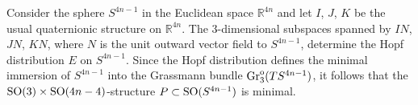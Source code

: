 \documentclass[10pt,a4paper]{amsart}
\numberwithin{equation}{section}
\begin{document}
\begin{Example}
Consider the sphere $S^{4n-1}$ in the Euclidean space $\mathbb{R}^{4n}$ and let $I$, $J$, $K$ be the usual quaternionic structure on $\mathbb{R}^{4n}$. The $3$-dimensional subspaces spanned by $IN$, $JN$, $KN$, where $N$ is the unit outward vector f\/ield to $S^{4n-1}$, determine the Hopf distribution $E$ on $S^{4n-1}$. Since the Hopf distribution def\/ines the minimal immersion of $S^{4n-1}$ into the Grassmann bundle $\operatorname{Gr}^{\rm o}_3(TS^{4n-1})$, it follows that the ${\rm SO}(3)\times {\rm SO}(4n-4)$-structure $P\subset {\rm SO}(S^{4n-1})$ is minimal.
\end{Example}

\vspace{-2mm}

\end{document}
